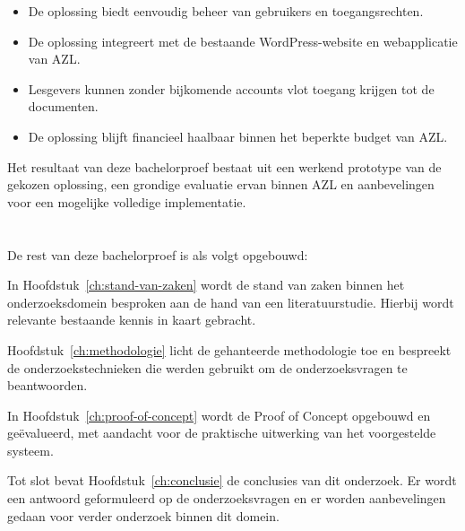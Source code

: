 \begin{itemize}
  \item De oplossing biedt eenvoudig beheer van gebruikers en toegangsrechten.
  \item De oplossing integreert met de bestaande WordPress-website en webapplicatie van AZL.
  \item Lesgevers kunnen zonder bijkomende accounts vlot toegang krijgen tot de documenten.
  \item De oplossing blijft financieel haalbaar binnen het beperkte budget van AZL.
\end{itemize}

Het resultaat van deze bachelorproef bestaat uit een werkend prototype van de gekozen oplossing, een grondige evaluatie ervan binnen AZL en aanbevelingen voor een mogelijke volledige implementatie.

\section{}%
\label{sec:opzet-bachelorproef}


De rest van deze bachelorproef is als volgt opgebouwd:

In Hoofdstuk~\ref{ch:stand-van-zaken} wordt de stand van zaken binnen het onderzoeksdomein besproken aan de hand van een literatuurstudie. Hierbij wordt relevante bestaande kennis in kaart gebracht.

Hoofdstuk~\ref{ch:methodologie} licht de gehanteerde methodologie toe en bespreekt de onderzoekstechnieken die werden gebruikt om de onderzoeksvragen te beantwoorden.

In Hoofdstuk~\ref{ch:proof-of-concept} wordt de Proof of Concept opgebouwd en geëvalueerd, met aandacht voor de praktische uitwerking van het voorgestelde systeem.

Tot slot bevat Hoofdstuk~\ref{ch:conclusie} de conclusies van dit onderzoek. Er wordt een antwoord geformuleerd op de onderzoeksvragen en er worden aanbevelingen gedaan voor verder onderzoek binnen dit domein.